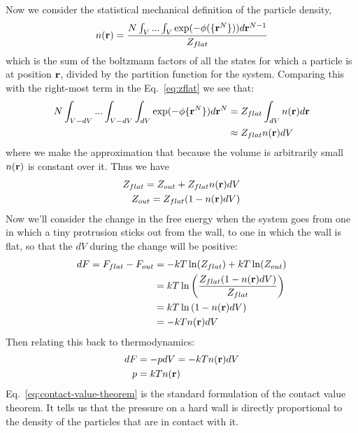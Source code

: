 Now we consider the statistical mechanical definition of the particle
density,
\begin{align}
  n(\textbf{r}) = \frac{N \int_{V}... \int_{V} \exp(-\phi (\{ \textbf{r}^N \}))d\textbf{r}^{N-1}}{Z_{flat}}
\end{align}
which is the sum of the boltzmann factors of all the states for which
a particle is at position $\textbf{r}$, divided by the partition function for
the system.  Comparing this with the right-most term in the
Eq.~\ref{eq:zflat} we see that:
\begin{align}
 N \int_{V-dV}... \int_{V-dV} \int_{dV} \exp(-\phi \{ \textbf{r}^N \})d\textbf{r}^N  &= Z_{flat} \int_{dV} n(\textbf{r}) d\textbf{r} \\
 &\approx Z_{flat} n(\textbf{r})dV
\end{align}
where we make the approximation that because the volume is arbitrarily
small $n(\textbf{r})$ is constant over it.  Thus we have
\begin{align}
Z_{flat} = Z_{out} + Z_{flat} n(\textbf{r})dV \\
Z_{out} = Z_{flat} (1-n(\textbf{r})dV)
\end{align}
Now we'll consider the change in the free energy when the system goes
from one in which a tiny protrusion sticks out from the wall, to one
in which the wall is flat, so that the $dV$ during the change will be
positive:
\begin{align}
  dF = F_{flat} - F_{out} &= - kT\ln(Z_{flat}) + kT \ln(Z_{out})  \notag \\
  &= kT \ln \left( \frac{Z_{flat} (1-n(\textbf{r})dV)}{Z_{flat}} \right) \notag \\
  &= kT \ln \left( 1-n(\textbf{r})dV \right) \notag \\
  &= -kTn(\textbf{r})dV
\end{align}
Then relating this back to thermodynamics:
\begin{align}
  dF &= -pdV = -kTn(\textbf{r})dV \\
  \label{eq:contact-value-theorem}
  p &= kTn(\textbf{r})
\end{align}
Eq.~\ref{eq:contact-value-theorem} is the standard formulation of the
contact value theorem.  It tells us that the pressure on a hard wall
is directly proportional to the density of the particles that are in
contact with it.



